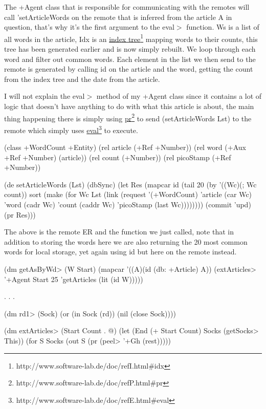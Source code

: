 The +Agent class that is responsible for communicating with the remotes will call 'setArticleWords on the remote that is inferred from the article A in question, that's why it's the first argument to the eval$>$ function. Ws is a list of all words in the article, Idx is an \underline{index tree}\footnote{http://www.software-lab.de/doc/refI.html\#idx} mapping words to their counts, this tree has been generated earlier and is now simply rebuilt. We loop through each word and filter out common words. Each element in the list we then send to the remote is generated by calling id on the article and the word, getting the count from the index tree and the date from the article.

I will not explain the eval$>$ method of my +Agent class since it contains a lot of logic that doesn't have anything to do with what this article is about, the main thing happening there is simply using \underline{pr}\footnote{http://www.software-lab.de/doc/refP.html\#pr} to send (setArticleWords Lst) to the remote which simply uses \underline{eval}\footnote{http://www.software-lab.de/doc/refE.html\#eval} to execute.

\begin{wideverbatim}
(class +WordCount +Entity)
(rel article   (+Ref +Number))
(rel word      (+Aux +Ref +Number) (article))
(rel count     (+Number))
(rel picoStamp (+Ref +Number))

\end{wideverbatim}

\begin{wideverbatim}

(de setArticleWords (Lst)
   (dbSync)
   (let Res
      (mapcar id
         (tail 20
            (by '((Wc)(; Wc count)) sort
               (make
                  (for Wc Lst
                     (link
                        (request
                           '(+WordCount)
                           'article (car Wc)
                           'word (cadr Wc)
                           'count (caddr Wc)
                           'picoStamp (last Wc))))))))
      (commit 'upd)
      (pr Res)))
\end{wideverbatim}

 
The above is the remote ER and the function we just called, note that in addition to storing the words here we are also returning the 20 most common words for local storage, yet again using id but here on the remote instead.
 
\begin{wideverbatim}
(dm getAsByWd> (W Start)
   (mapcar '((A)(id (db: +Article) A))
      (extArticles> '+Agent Start 25 'getArticles (lit (id W)))))

. . .

(dm rd1> (Sock)
   (or
      (in Sock (rd))
      (nil
         (close Sock))))

(dm extArticles> (Start Count . @)
   (let (End (+ Start Count) Socks (getSocks> This))
      (for S Socks
         (out S (pr (peel> '+Gh (rest)))))

\end{wideverbatim}

